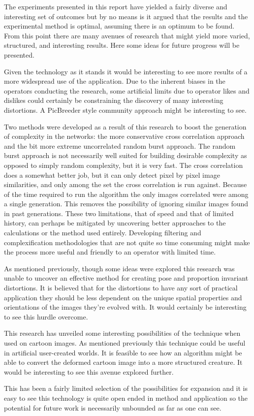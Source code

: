 The experiments presented in this report have yielded a fairly diverse and interesting set of outcomes but by no means is it argued that the results and the experimental method is optimal, assuming there is an optimum to be found. From this point there are many avenues of research that might yield more varied, structured, and interesting results. Here some ideas for future progress will be presented.

Given the technology as it stands it would be interesting to see more results of a more widespread use of the application. Due to the inherent biases in the operators conducting the research, some artificial limits due to operator likes and dislikes could certainly be constraining the discovery of many interesting distortions. A PicBreeder style community approach might be interesting to see.

Two methods were developed as a result of this research to boost the generation of complexity in the networks: the more conservative cross correlation approach and the bit more extreme uncorrelated random burst approach. The random burst approach is not necessarily well suited for building desirable complexity as opposed to simply random complexity, but it is very fast. The cross correlation does a somewhat better job, but it can only detect pixel by pixel image similarities, and only among the set the cross correlation is run against. Because of the time required to run the algorithm the only images correlated were among a single generation. This removes the possibility of ignoring similar images found in past generations. These two limitations, that of speed and that of limited history, can perhaps be mitigated by uncovering better approaches to the calculations or the method used entirely. Developing filtering and complexification methodologies that are not quite so time consuming might make the process more useful and friendly to an operator with limited time.

As mentioned previously, though some ideas were explored this research was unable to uncover an effective method for creating pose and proportion invariant distortions. It is believed that for the distortions to have any sort of practical application they should be less dependent on the unique spatial properties and orientations of the images they're evolved with. It would certainly be interesting to see this hurdle overcome.

This research has unveiled some interesting possibilities of the technique when used on cartoon images. As mentioned previously this technique could be useful in artificial user-created worlds. It is feasible to see how an algorithm might be able to convert the deformed cartoon image into a more structured creature. It would be interesting to see this avenue explored further.

This has been a fairly limited selection of the possibilities for expansion and it is easy to see this technology is quite open ended in method and application so the potential for future work is necessarily unbounded as far as one can see.